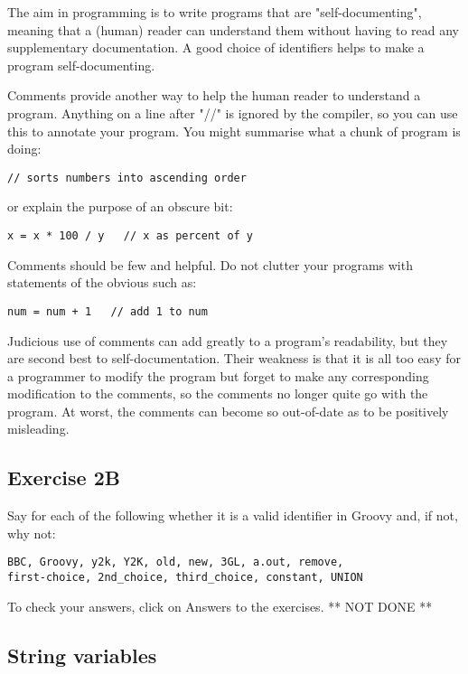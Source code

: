 The aim in programming is to write programs that are "self-documenting",
meaning that a (human) reader can understand them without having to read
any supplementary documentation.  A good choice of identifiers helps to
make a program self-documenting.

Comments provide another way to help the human reader to understand a
program.  Anything on a line after "//" is ignored by the compiler,
so you can use this to annotate your program.  You might summarise
what a chunk of program is doing:
\begin{Verbatim}
// sorts numbers into ascending order
\end{Verbatim}
or explain the purpose of an obscure bit:
\begin{Verbatim}
x = x * 100 / y   // x as percent of y
\end{Verbatim}

Comments should be few and helpful.  Do not clutter your programs with
statements of the obvious such as:
\begin{Verbatim}
num = num + 1   // add 1 to num
\end{Verbatim}
Judicious use of comments can add greatly to a program's readability, but they
are second best to self-documentation.  Their weakness is that it is all too
easy for a programmer to modify the program but forget to make any
corresponding modification to the comments, so the comments no longer quite
go with the program.  At worst, the comments can become so out-of-date as
to be positively misleading.

\subsection{Exercise 2B}

Say for each of the following whether it is a valid identifier
in Groovy and, if not, why not:
\begin{Verbatim}
BBC, Groovy, y2k, Y2K, old, new, 3GL, a.out, remove,
first-choice, 2nd_choice, third_choice, constant, UNION
\end{Verbatim}

To check your answers, click on Answers to the exercises. ** NOT DONE **

\subsection{String variables}

